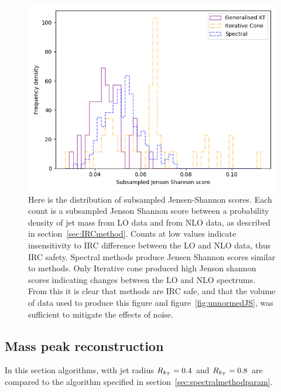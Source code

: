\begin{figure}[htp]
    \begin{minipage}[c]{0.6\textwidth}
    \includegraphics[width=1.\textwidth]{graphics/JensenShannon.png}
    \end{minipage}\hfill
    \begin{minipage}[c]{0.35\textwidth}
    \caption{Here is the distribution of subsampled Jensen-Shannon scores.
        Each count is a subsampled Jenson Shannon score between a probability density of jet mass from LO data and
        from NLO data, as described in section~\ref{sec:IRCmethod}.
        Counts at low values indicate insensitivity to IRC difference between the LO and NLO data,
        thus IRC safety.
        Spectral methods produce Jensen Shannon scores similar to \genkt{}
        methods. Only Iterative cone produced high Jenson shannon scores indicating changes
        between the LO and NLO spectrums.
        From this it is clear that \spectral{} methods are IRC safe,
        and that the volume of data used to produce this figure and figure~\ref{fig:unnormedJS},
        was sufficient to mitigate the effects of noise.
    }\label{fig:jensenshannon}
    \end{minipage}
\end{figure}    

\FloatBarrier{}
\subsection{Mass peak reconstruction}
In this section \antikt{} algorithms, with jet radius \(R_{k_T}{} = 0.4\) and \(R_{k_T}{} = 0.8\)
are compared to the \spectral{} algorithm specified in section~\ref{sec:spectralmethodparam}.


